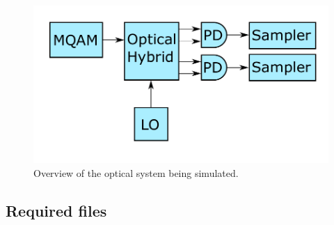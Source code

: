 \begin{figure}[h]
\centering
\includegraphics[width=\linewidth]{./sdf/quantum_noise/figures/scheme1.pdf}
\caption{Overview of the optical system being simulated.}
\label{fig:setup}
\end{figure}


\subsection*{Required files}\label{Required files}

